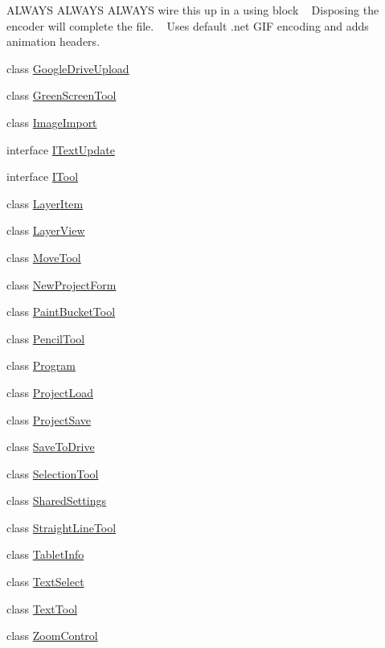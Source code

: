 \begin{DoxyCompactItemize}
\begin{DoxyCompactList}
 A\+L\+W\+A\+YS A\+L\+W\+A\+YS A\+L\+W\+A\+YS wire this up in a using block ~\newline
 Disposing the encoder will complete the file. ~\newline
 Uses default .net G\+IF encoding and adds animation headers. \end{DoxyCompactList}\item 
class \mbox{\hyperlink{class_paint___program_1_1_google_drive_upload}{Google\+Drive\+Upload}}
\item 
class \mbox{\hyperlink{class_paint___program_1_1_green_screen_tool}{Green\+Screen\+Tool}}
\item 
class \mbox{\hyperlink{class_paint___program_1_1_image_import}{Image\+Import}}
\item 
interface \mbox{\hyperlink{interface_paint___program_1_1_i_text_update}{I\+Text\+Update}}
\item 
interface \mbox{\hyperlink{interface_paint___program_1_1_i_tool}{I\+Tool}}
\item 
class \mbox{\hyperlink{class_paint___program_1_1_layer_item}{Layer\+Item}}
\item 
class \mbox{\hyperlink{class_paint___program_1_1_layer_view}{Layer\+View}}
\item 
class \mbox{\hyperlink{class_paint___program_1_1_move_tool}{Move\+Tool}}
\item 
class \mbox{\hyperlink{class_paint___program_1_1_new_project_form}{New\+Project\+Form}}
\item 
class \mbox{\hyperlink{class_paint___program_1_1_paint_bucket_tool}{Paint\+Bucket\+Tool}}
\item 
class \mbox{\hyperlink{class_paint___program_1_1_pencil_tool}{Pencil\+Tool}}
\item 
class \mbox{\hyperlink{class_paint___program_1_1_program}{Program}}
\item 
class \mbox{\hyperlink{class_paint___program_1_1_project_load}{Project\+Load}}
\item 
class \mbox{\hyperlink{class_paint___program_1_1_project_save}{Project\+Save}}
\item 
class \mbox{\hyperlink{class_paint___program_1_1_save_to_drive}{Save\+To\+Drive}}
\item 
class \mbox{\hyperlink{class_paint___program_1_1_selection_tool}{Selection\+Tool}}
\item 
class \mbox{\hyperlink{class_paint___program_1_1_shared_settings}{Shared\+Settings}}
\item 
class \mbox{\hyperlink{class_paint___program_1_1_straight_line_tool}{Straight\+Line\+Tool}}
\item 
class \mbox{\hyperlink{class_paint___program_1_1_tablet_info}{Tablet\+Info}}
\item 
class \mbox{\hyperlink{class_paint___program_1_1_text_select}{Text\+Select}}
\item 
class \mbox{\hyperlink{class_paint___program_1_1_text_tool}{Text\+Tool}}
\item 
class \mbox{\hyperlink{class_paint___program_1_1_zoom_control}{Zoom\+Control}}
\end{DoxyCompactItemize}
